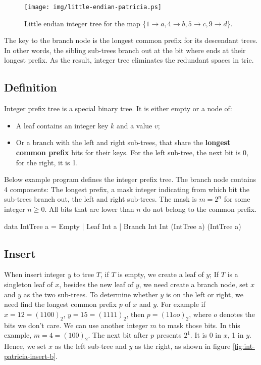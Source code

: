 \documentclass[b5paper]{article}
\begin{document}
\begin{figure}[htbp]
  \centering
  \texttt{[image: img/little-endian-patricia.ps]}
  \caption{Little endian integer tree for the map
     \{$ 1 \rightarrow a, 4 \rightarrow b, 5 \rightarrow c, 9 \rightarrow d$\}.}
  \label{fig:little-endian-patricia}
\end{figure}

The key to the branch node is the longest common prefix for its descendant trees. In other words, the sibling sub-trees branch out at the bit where ends at their longest prefix. As the result, integer tree eliminates the redundant spaces in trie.

\subsection{Definition}

Integer prefix tree is a special binary tree. It is either empty or a node of:

\begin{itemize}
\item A leaf contains an integer key $k$ and a value $v$;
\item Or a branch with the left and right sub-trees, that share the \textbf{longest common prefix} bits for their keys. For the left sub-tree, the next bit is 0, for the right, it is 1.
\end{itemize}

Below example program defines the integer prefix tree. The branch node contains 4 components: The longest prefix, a mask integer indicating from which bit the sub-trees branch out, the left and right sub-trees. The mask is $m = 2^n$ for some integer $n \geq 0$. All bits that are lower than $n$ do not belong to the common prefix.

\begin{Haskell}
data IntTree a = Empty
               | Leaf Int a
               | Branch Int Int (IntTree a) (IntTree a)
\end{Haskell}

\subsection{Insert}
When insert integer $y$ to tree $T$, if $T$ is empty, we create a leaf of $y$; If $T$ is a singleton leaf of $x$, besides the new leaf of $y$, we need create a branch node, set $x$ and $y$ as the two sub-trees. To determine whether $y$ is on the left or right, we need find the longest common prefix $p$ of $x$ and $y$. For example if $x = 12 = (1100)_2$, $y = 15 = (1111)_2$, then $p = (11oo)_2$, where $o$ denotes the bits we don't care. We can use another integer $m$ to mask those bits. In this example, $m = 4 = (100)_2$. The next bit after $p$ presents $2^1$. It is 0 in $x$, 1 in $y$. Hence, we set $x$ as the left sub-tree and $y$ as the right, as shown in figure \ref{fig:int-patricia-insert-b}.
\end{document}
